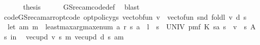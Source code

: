 \begin{isabellebody}
\ \ \isamarkupfalse%
\isanewline
\ \ \isamarkupfalse%
\ {\isacharquery}{\kern0pt}thesis\isanewline
\ \ \ \ \isamarkupfalse%
\ GS{\isacharunderscore}{\kern0pt}rec{\isacharunderscore}{\kern0pt}am{\isacharunderscore}{\kern0pt}code{\isacharprime}{\kern0pt}{\isacharunderscore}{\kern0pt}def\ \isamarkupfalse%
\ blast\isanewline
{}\isamarkupfalse%
%
\endisatagproof
{\isafoldproof}%
%
\isadelimproof
\isanewline
%
\endisadelimproof
\isanewline
\isanewline
{}\isamarkupfalse%
\ code{\isacharunderscore}{\kern0pt}GS{\isacharunderscore}{\kern0pt}rec{\isacharunderscore}{\kern0pt}am{\isacharunderscore}{\kern0pt}arr{\isacharunderscore}{\kern0pt}opt{\isacharbrackleft}{\kern0pt}code{\isacharbrackright}{\kern0pt}{\isacharcolon}{\kern0pt}\ {\isachardoublequoteopen}opt{\isacharunderscore}{\kern0pt}policy{\isacharunderscore}{\kern0pt}gs{\isacharprime}{\kern0pt}{\isacharprime}{\kern0pt}\ {\isacharparenleft}{\kern0pt}vec{\isacharunderscore}{\kern0pt}to{\isacharunderscore}{\kern0pt}bfun\ v{\isacharparenright}{\kern0pt}\ {\isacharequal}{\kern0pt}\ vec{\isacharunderscore}{\kern0pt}to{\isacharunderscore}{\kern0pt}fun\ {\isacharparenleft}{\kern0pt}{\isacharparenleft}{\kern0pt}snd\ {\isacharparenleft}{\kern0pt}foldl\ {\isacharparenleft}{\kern0pt}{\isasymlambda}{\isacharparenleft}{\kern0pt}v{\isacharcomma}{\kern0pt}\ d{\isacharparenright}{\kern0pt}\ s{\isachardot}{\kern0pt}\isanewline
\ \ let\ {\isacharparenleft}{\kern0pt}am{\isacharcomma}{\kern0pt}\ m{\isacharparenright}{\kern0pt}\ {\isacharequal}{\kern0pt}\ least{\isacharunderscore}{\kern0pt}max{\isacharunderscore}{\kern0pt}arg{\isacharunderscore}{\kern0pt}max{\isacharunderscore}{\kern0pt}enum\ {\isacharparenleft}{\kern0pt}{\isasymlambda}a{\isachardot}{\kern0pt}\ r\ {\isacharparenleft}{\kern0pt}s{\isacharcomma}{\kern0pt}\ a{\isacharparenright}{\kern0pt}\ {\isacharplus}{\kern0pt}\ l\ {\isacharasterisk}{\kern0pt}\ {\isacharparenleft}{\kern0pt}{\isasymSum}s{\isacharprime}{\kern0pt}\ {\isasymin}\ UNIV{\isachardot}{\kern0pt}\ pmf\ {\isacharparenleft}{\kern0pt}K\ {\isacharparenleft}{\kern0pt}s{\isacharcomma}{\kern0pt}a{\isacharparenright}{\kern0pt}{\isacharparenright}{\kern0pt}\ s{\isacharprime}{\kern0pt}\ {\isacharasterisk}{\kern0pt}\ v\ {\isachardollar}{\kern0pt}\ s{\isacharprime}{\kern0pt}{\isacharparenright}{\kern0pt}{\isacharparenright}{\kern0pt}\ {\isacharparenleft}{\kern0pt}A\ s{\isacharparenright}{\kern0pt}\ in\isanewline
\ \ {\isacharparenleft}{\kern0pt}vec{\isacharunderscore}{\kern0pt}upd\ v\ s\ m{\isacharcomma}{\kern0pt}\ vec{\isacharunderscore}{\kern0pt}upd\ d\ s\ am{\isacharparenright}{\kern0pt}{\isacharparenright}{\kern0pt}\ \isanewline

\end{isabellebody}
